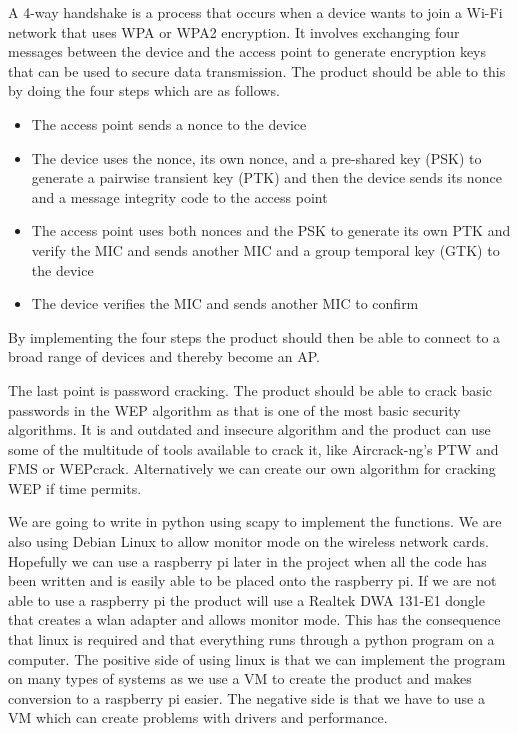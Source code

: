 A 4-way handshake is a process that occurs when a device wants to join a Wi-Fi network that uses WPA or WPA2 encryption. It involves exchanging four messages between the device and the access point to generate encryption keys that can be used to secure data transmission. The product should be able to this by doing the four steps which are as follows.
\begin{itemize}
    \item The access point sends a nonce to the device
    \item The device uses the nonce, its own nonce, and a pre-shared key (PSK) to generate a pairwise transient key (PTK) and then the device sends its nonce and a message integrity code to the access point
    \item The access point uses both nonces and the PSK to generate its own PTK and verify the MIC and  sends another MIC and a group temporal key (GTK) to the device
    \item The device verifies the MIC and sends another MIC to confirm
\end{itemize}
By implementing the four steps the product should then be able to connect to a broad range of devices and thereby become an AP.

The last point is password cracking. The product should be able to crack basic passwords in the WEP algorithm as that is one of the most basic security algorithms. It is and outdated and insecure algorithm and the product can use some of the multitude of tools available to crack it, like Aircrack-ng's PTW and FMS or WEPcrack. Alternatively we can create our own algorithm for cracking WEP if time permits.

We are going to write in python using scapy to implement the functions. We are also using Debian Linux to allow monitor mode on the wireless network cards. Hopefully we can use a raspberry pi later in the project when all the code has been written and is easily able to be placed onto the raspberry pi. 
If we are not able to use a raspberry pi the product will use a Realtek DWA 131-E1 dongle that creates a wlan adapter and allows monitor mode. This has the consequence that linux is required and that everything runs through a python program on a computer.
The positive side of using linux is that we can implement the program on many types of systems as we use a VM to create the product and makes conversion to a raspberry pi easier. The negative side is that we have to use a VM which can create problems with drivers and performance. 

